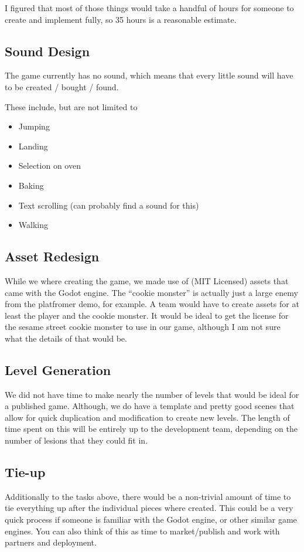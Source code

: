 \documentclass{article}
\begin{document}
I figured that most of those things would take a handful of hours for
someone to create and implement fully, so 35 hours is a reasonable
estimate.

\subsection{Sound Design}

The game currently has no sound, which means that every little sound
will have to be created / bought / found.

These include, but are not limited to

\begin{itemize}
  \item Jumping
  \item Landing
  \item Selection on oven
  \item Baking
  \item Text scrolling (can probably find a sound for this)
  \item Walking
\end{itemize}

\subsection{Asset Redesign}

While we where creating the game, we made use of (MIT Licensed) assets
that came with the Godot engine. The ``cookie monster'' is actually
just a large enemy from the platfromer demo, for example. A team would
have to create assets for at least the player and the cookie
monster. It would be ideal to get the license for the sesame street
cookie monster to use in our game, although I am not sure what the
details of that would be.

\subsection{Level Generation}

We did not have time to make nearly the number of levels that would be
ideal for a published game. Although, we do have a template and pretty
good scenes that allow for quick duplication and modification to
create new levels. The length of time spent on this will be entirely
up to the development team, depending on the number of lesions that
they could fit in.

\subsection{Tie-up}

Additionally to the tasks above, there would be a non-trivial amount
of time to tie everything up after the individual pieces where
created. This could be a very quick process if someone is familiar
with the Godot engine, or other similar game engines. You can also
think of this as time to market/publish and work with partners and deployment.
\end{document}
